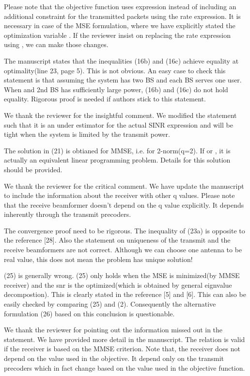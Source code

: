 \resp Please note that the objective function uses  expression instead of including an additional constraint for the transmitted packets using the rate expression. It is necessary in case of the MSE formulation, where we have explicitly stated the optimization variable . If the reviewer insist on replacing the rate expression using , we can make those changes.

 The manuscript states that the inequalities (16b) and (16c) achieve equality at optimality(line 23, page 5). This is not obvious. An easy case to check this statement is that assuming the system has two BS and each BS serves one user. When  and 2nd BS has sufficiently large power, (16b) and (16c) do not hold equality. Rigorous proof is needed if authors stick to this statement.

\resp We thank the reviewer for the insightful comment. We modified the statement such that it is an under estimator for the actual SINR expression and will be tight when the system is limited by the transmit power.

 The solution in (21) is obtianed for MMSE, i.e. for 2-norm(q=2). If  or , it is actually an equivalent linear programming problem. Details for this solution should be provided.

\resp We thank the reviewer for the critical comment. We have update the manuscript to include the information about the receiver with other q values. Please note that the receive beamformer doesn't depend on the q value explicitly. It depends inherently through the transmit precoders.

 The convergence proof need to be rigorous. The inequality of (23a) is opposite to the reference [28]. Also the statement on uniqueness of the transmit and the receive beamformers are not correct. Although we can choose one antenna to be real value, this does not mean the problem has unique solution!

 (25) is generally wrong. (25) only holds when the MSE is minimized(by MMSE receiver) and the snr is the optimized(which is obtained by general eignvalue decompostion). This is clearly stated in the reference [5] and [6]. This can also be easily checked by comparing (25) and (2). Consequently the alternative formulation (26) based on this conclusion is questionable.

\resp We thank the reviewer for pointing out the information missed out in the statement. We have provided more detail in the manuscript. The relation is valid if the receiver is based on the MMSE criterion. Note that, the receiver does not depend on the  value used in the objective. It depend only on the transmit precoders which in fact change based on the  value used in the objective function. 

